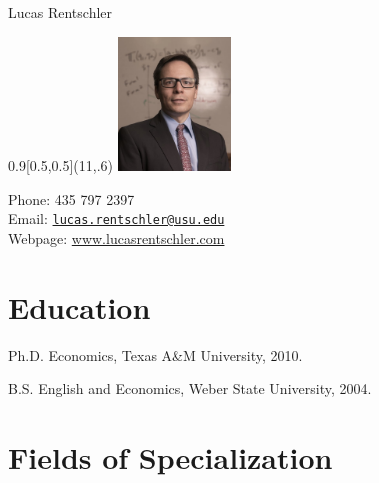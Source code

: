 \documentclass{article}%
\def\name{Lucas Rentschler}
\renewenvironment{itemize}{
\begin{list}{}{
\setlength{\leftmargin}{1.5em}
}
}{
\end{list}
}
\begin{document}



{\Huge Lucas Rentschler}\\


\begin{textblock}{0.9}[0.5,0.5](11,.6)
\includegraphics[width=3cm]{cvphototie.jpg}
\end{textblock}

Phone: 435 797 2397 \\
Email: \href{mailto:lucas.rentschler@usu.edu}{\tt lucas.rentschler@usu.edu} \\
Webpage: \href{lucasrentschler.com}{www.lucasrentschler.com}\\


\section*{Education}

\begin{itemize}
\item Ph.D. Economics, Texas A\&M University, 2010.

\item B.S. English and Economics, Weber State University, 2004.

\end{itemize}

\section*{Fields of Specialization}
\end{document}
